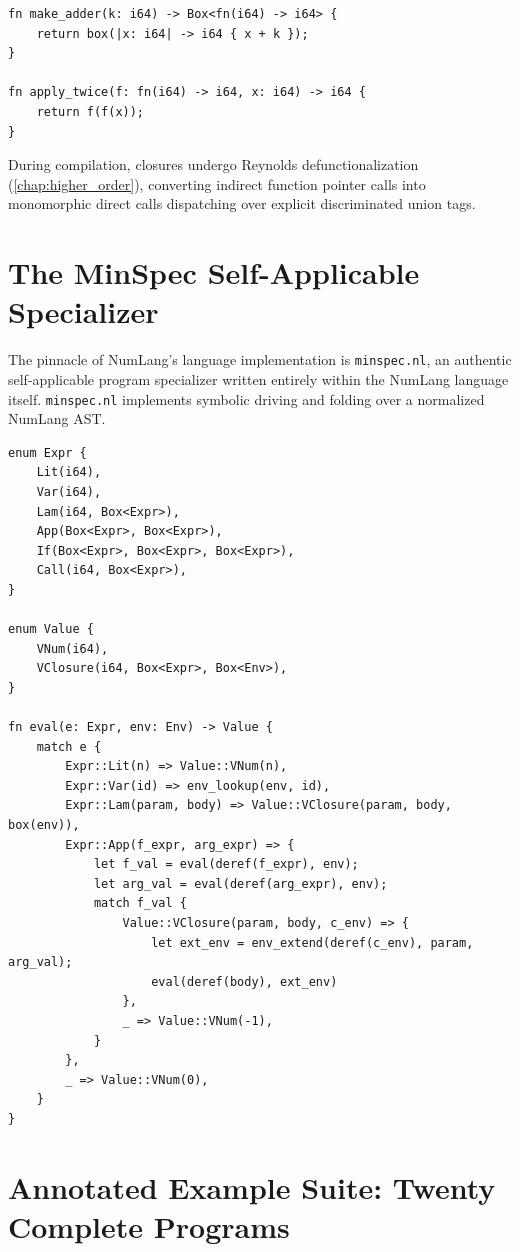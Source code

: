 \begin{lstlisting}[language=NumLang, caption={Higher-Order Composition and Closure Capture.}]
fn make_adder(k: i64) -> Box<fn(i64) -> i64> {
    return box(|x: i64| -> i64 { x + k });
}

fn apply_twice(f: fn(i64) -> i64, x: i64) -> i64 {
    return f(f(x));
}
\end{lstlisting}

During compilation, closures undergo Reynolds defunctionalization (\cref{chap:higher_order}), converting indirect function pointer calls into monomorphic direct calls dispatching over explicit discriminated union tags.

\section{The MinSpec Self-Applicable Specializer}
\label{sec:lang:minspec}

The pinnacle of NumLang's language implementation is \texttt{minspec.nl}, an authentic self-applicable program specializer written entirely within the NumLang language itself. \texttt{minspec.nl} implements symbolic driving and folding over a normalized NumLang AST.

\begin{lstlisting}[language=NumLang, caption={Excerpts from the MinSpec Self-Applicable Specializer (\texttt{minspec.nl}).}]
enum Expr {
    Lit(i64),
    Var(i64),
    Lam(i64, Box<Expr>),
    App(Box<Expr>, Box<Expr>),
    If(Box<Expr>, Box<Expr>, Box<Expr>),
    Call(i64, Box<Expr>),
}

enum Value {
    VNum(i64),
    VClosure(i64, Box<Expr>, Box<Env>),
}

fn eval(e: Expr, env: Env) -> Value {
    match e {
        Expr::Lit(n) => Value::VNum(n),
        Expr::Var(id) => env_lookup(env, id),
        Expr::Lam(param, body) => Value::VClosure(param, body, box(env)),
        Expr::App(f_expr, arg_expr) => {
            let f_val = eval(deref(f_expr), env);
            let arg_val = eval(deref(arg_expr), env);
            match f_val {
                Value::VClosure(param, body, c_env) => {
                    let ext_env = env_extend(deref(c_env), param, arg_val);
                    eval(deref(body), ext_env)
                },
                _ => Value::VNum(-1),
            }
        },
        _ => Value::VNum(0),
    }
}
\end{lstlisting}

\section{Annotated Example Suite: Twenty Complete Programs}
\label{sec:lang:examples}

